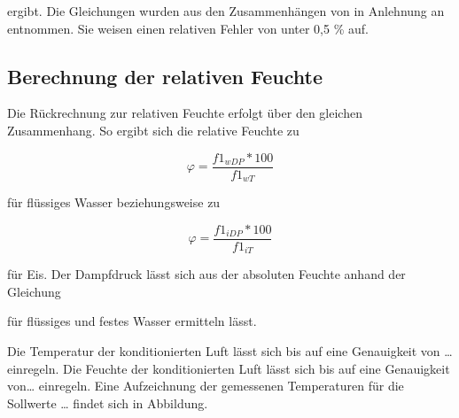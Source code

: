 ergibt. Die Gleichungen wurden aus den Zusammenhängen von \cite{.b} in Anlehnung an \cite{Buck.1981} entnommen. Sie weisen einen relativen Fehler von unter 0,5 \% auf.

\subsection{Berechnung der relativen Feuchte}
Die Rückrechnung zur relativen Feuchte erfolgt über den gleichen Zusammenhang. So ergibt sich die relative Feuchte zu

\begin{equation}
\varphi = \frac{f1_{wDP}*100}{f1_{wT}} 
\end{equation}

für flüssiges Wasser beziehungsweise zu 

\begin{equation}
\varphi = \frac{f1_{iDP}*100}{f1_{iT}} 
\end{equation}

für Eis. Der Dampfdruck lässt sich aus der absoluten Feuchte anhand der Gleichung


für flüssiges und festes Wasser ermitteln lässt.


Die Temperatur der konditionierten Luft lässt sich bis auf eine Genauigkeit von … einregeln. Die Feuchte der konditionierten Luft lässt sich bis auf eine Genauigkeit von… einregeln. Eine Aufzeichnung der gemessenen Temperaturen für die Sollwerte … findet sich in Abbildung.

